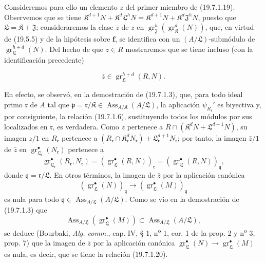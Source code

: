 Consideremos para ello un elemento $z$ del primer miembro de (19.7.1.19). Observemos que se tiene $\mathfrak K^{d+1}N+\mathfrak K^d\mathfrak L^hN=\mathfrak K^{d+1}N+\mathfrak K^d\mathfrak J^hN$, puesto que $\mathfrak L=\mathfrak K+\mathfrak J$; consideraremos la clase $\bar z$ de $z$ en $\operatorname{gr}_{\mathfrak J}^h(\operatorname{gr}_{\mathfrak K}^d(N))$, que, en virtud de (19.5.5) y de la hipótesis sobre $\mathbf f$, se identifica con un $(A/\mathfrak L)$-submódulo de $\operatorname{gr}_{\mathfrak L}^{h+d}(N)$. Del hecho de que $z\in R$ mostraremos que se tiene incluso (con la identificación precedente)
\begin{env}[19.7.1.20]
\label{IV.19.7.1.20}
\[
  \bar z\in\operatorname{gr}_{\mathfrak L}^{h+d}(R,N).
\]
\end{env}

En efecto, se observó, en la demostración de (19.7.1.3), que, para todo ideal primo $\mathfrak r$ de $A$ tal que $\mathfrak p=\mathfrak r/\mathfrak K\in\operatorname{Ass}_{A/\mathfrak K}(A/\mathfrak L)$, la aplicación $\psi_{R_{\mathfrak r}}'$ es biyectiva y, por consiguiente, la relación (19.7.1.6), sustituyendo todos los módulos por sus localizados en $\mathfrak r$, es verdadera. Como $z$ pertenece a $R\cap(\mathfrak K^dN+\mathfrak L^{d+1}N)$, su imagen $z/1$ en $R_{\mathfrak r}$ pertenece a $(R_{\mathfrak r}\cap\mathfrak K_{\mathfrak r}^dN_{\mathfrak r})+\mathfrak L_{\mathfrak r}^{d+1}N_{\mathfrak r}$; por tanto, la imagen $\bar z/1$ de $\bar z$ en $\operatorname{gr}_{\mathfrak L_{\mathfrak r}}^\bullet(N_{\mathfrak r})$ pertenece a
\[
  \operatorname{gr}_{\mathfrak L_{\mathfrak r}}^\bullet(R_{\mathfrak r},N_{\mathfrak r})
  =(\operatorname{gr}_{\mathfrak L}^\bullet(R,N))_{\mathfrak r}
  =(\operatorname{gr}_{\mathfrak L}^\bullet(R,N))_{\mathfrak q},
\]
donde $\mathfrak q=\mathfrak r/\mathfrak L$. En otros términos, la imagen de $\bar z$ por la aplicación canónica
\[
  (\operatorname{gr}_{\mathfrak L}^\bullet(N))_{\mathfrak q}\longrightarrow(\operatorname{gr}_{\mathfrak L}^\bullet(M))_{\mathfrak q}
\]
es nula para todo $\mathfrak q\in\operatorname{Ass}_{A/\mathfrak L}(A/\mathfrak L)$. Como se vio en la demostración de (19.7.1.3) que
\[
  \operatorname{Ass}_{A/\mathfrak L}(\operatorname{gr}_{\mathfrak L}^\bullet(M))\subset\operatorname{Ass}_{A/\mathfrak L}(A/\mathfrak L),
\]
se deduce (Bourbaki, \emph{Alg. comm.}, cap. IV, § 1, n\textsuperscript{o} 1, cor. 1 de la prop. 2 y n\textsuperscript{o} 3, prop. 7) que la imagen de $\bar z$ por la aplicación canónica $\operatorname{gr}_{\mathfrak L}^\bullet(N)\to\operatorname{gr}_{\mathfrak L}^\bullet(M)$ es nula, es decir, que se tiene la relación (19.7.1.20).

